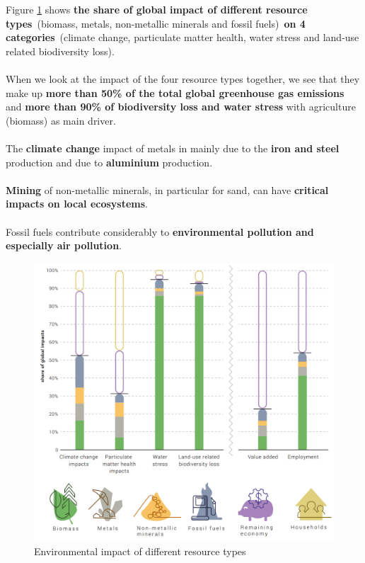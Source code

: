 \documentclass[../summary.tex]{subfiles}
\begin{document}
	Figure \ref{fig:5-material-impact} shows \textbf{the share of global impact of different resource types} (biomass, metals, non-metallic minerals and fossil fuels) \textbf{on 4 categories} (climate change, particulate matter health, water stress and land-use related biodiversity loss). 
	\\\\
	When we look at the impact of the four resource types together, we see that they make up \textbf{more than 50\% of the total global greenhouse gas emissions} and \textbf{more than 90\% of biodiversity loss and water stress} with agriculture (biomass) as main driver.
	\\\\
	The \textbf{climate change} impact of metals in mainly due to the \textbf{iron and steel} production and due to \textbf{aluminium} production.
	\\
	\\
	\textbf{Mining} of non-metallic minerals, in particular for sand, can have \textbf{critical impacts on local ecosystems}.
	\\
	\\
	Fossil fuels contribute considerably to \textbf{environmental pollution and especially air pollution}.
	
	\begin{figure}[H]
		\centering
		\includegraphics[width=0.9\linewidth]{../images/5-material-impact}
		\caption{Environmental impact of different resource types}
		\label{fig:5-material-impact}
	\end{figure}
	\newpage
	
\end{document}

